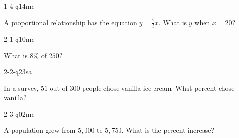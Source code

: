 \documentclass[12pt, fleqn, openany]{studyGuide}
\begin{document}
\renewcommand{\VMBookTitle}{7 Virginia SOL Grade 7 Math Practice Tests}
\renewcommand{\VMBookSubtitle}{Comprehensive Test Prep with Detailed Answers}
\renewcommand{\VMFooterURL}{https://viewmath.com/grade7}
\renewcommand{\VMFooterURLDisplay}{ViewMath.com/Grade7}






\tableofcontents
\cleardoublepage
{}


\begin{practiceQuestion}{1-4-q14}{mc}
\begin{questionText}
A proportional relationship has the equation $y = \frac{2}{5}x$. What is $y$ when $x = 20$?
\end{questionText}
\end{practiceQuestion}

\begin{practiceQuestion}{2-1-q10}{mc}
\begin{questionText}
What is $8\%$ of $250$?
\end{questionText}
\end{practiceQuestion}

\begin{practiceQuestion}{2-2-q23}{sa}
\begin{questionText}
In a survey, $51$ out of $300$ people chose vanilla ice cream. What percent chose vanilla?
\end{questionText}
\end{practiceQuestion}

\begin{practiceQuestion}{2-3-q02}{mc}
\begin{questionText}
A population grew from $5{,}000$ to $5{,}750$. What is the percent increase?
\end{questionText}
\end{practiceQuestion}
\end{document}
